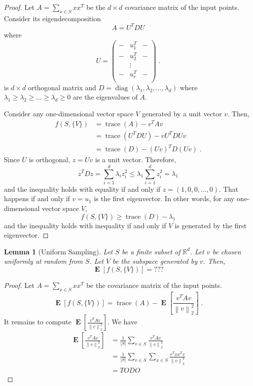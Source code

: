 \documentclass{article}
\newtheorem{lemma}[theorem]{Lemma}
\newcommand{\R}{\mathbb{R}}
\newcommand{\norm}[1]{\left\|#1\right\|}
\DeclareMathOperator*{\diag}{diag}
\DeclareMathOperator*{\trace}{trace}
\DeclareMathOperator*{\Exp}{\mathbf{E}}
\begin{document}
\begin{proof}
Let $A = \sum_{x \in S} xx^T$ be the $d \times d$
covariance matrix of the input points. Consider its eigendecomposition
$$
A = U^T D U
$$
where
$$
U =
\begin{pmatrix}
- & u_1^T & - \\
- & u_2^T & - \\
  & \vdots & \\
- & u_r^T & - \\
\end{pmatrix} \; .
$$
is $d \times d$ orthogonal matrix and $D = \diag(\lambda_1,
\lambda_2, \dots, \lambda_d)$ where $\lambda_1 \ge \lambda_2 \ge \dots \ge
\lambda_d \ge 0$ are the eigenvalues of $A$.

Consider any one-dimensional vector space $V$ generated by a unit vector $v$.
Then,
\begin{align*}
f(S, \{V\})
& = \trace(A) - v^T A v \\
& = \trace(U^T D U) - v U^T D U v \\
& = \trace(D) - (Uv)^T D (Uv) \; .
\end{align*}
Since $U$ is orthogonal, $z=Uv$ is a unit vector. Therefore,
$$
z^T D z = \sum_{i=1}^d \lambda_i z_i^2 \le \lambda_1 \sum_{i=1}^d z_i^2 = \lambda_1
$$
and the inequality holds with equality if and only if $z=(1,0,0,\dots,0)$.
That happens if and only if $v=u_1$ is the first eigenvector.
In other words, for any one-dimensional vector space $V$,
$$
f(S, \{V\}) \ge \trace(D) - \lambda_1
$$
and the inequality holds with inequality if and only if $V$ is generated
by the first eigenvector.
\end{proof}

\begin{lemma}[Uniform Sampling]
Let $S$ be a finite subset of $\R^d$. Let $v$ be chosen uniformly at random from $S$.
Let $V$ be the subspace generated by $v$. Then,
$$
\Exp[f(S,\{V\})] = ???
$$
\end{lemma}

\begin{proof}
Let $A = \sum_{x \in S} xx^T$ be the covariance matrix of the input points.
$$
\Exp[f(S, \{V\})]
= \trace(A) - \Exp\left[ \frac{v^TAv}{\norm{v}_2^2} \right] \; .
$$
It remains to compute $\Exp[\frac{v^TAv}{\norm{v}_2^2}]$. We have
\begin{align*}
\Exp\left[ \frac{v^TAv}{\norm{v}_2^2} \right]
& = \frac{1}{|S|} \sum_{v \in S} \frac{v^TAv}{\norm{v}_2^2} \\
& = \frac{1}{|S|} \sum_{v \in S} \sum_{x \in S} \frac{v^T x x^T v}{\norm{v}_2^2} \\
& = TODO
\end{align*}

\end{proof}
\end{document}
